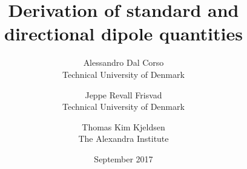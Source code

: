 \documentclass[10pt,a4paper]{article}
\title{Derivation of standard and directional dipole quantities}
\date{September 2017}
\author{Alessandro Dal Corso \\ Technical University of Denmark \and Jeppe Revall Frisvad \\ Technical University of Denmark
\and Thomas Kim Kjeldsen \\ The Alexandra Institute
}
\begin{document}
\maketitle
\newcommand{\vecfunc}[2] {\mathbf{#1}(\mathbf{#2})}
\newcommand{\func}[2] {{#1}(\mathbf{#2})}
\newcommand{\omegafunc}[2] {{#1}(\mathbf{#2}, \vec{\omega})}


\newcommand{\xvecfunc}[1] {\vecfunc{#1}{x}}
\newcommand{\xfunc}[1] {\func{#1}{x}}
\newcommand{\xomegafunc}[1] {\omegafunc{#1}{x}}
\newcommand{\nablavec} {{\nabla}}
\newcommand{\omegavec} {\vec{\omega}}
\newcommand{\sphere}[2] {\int_{4\pi}{#1}\ d{\ifthenelse{\isempty{#2}{}}{{\omega}}{#2}}}
\newcommand{\hemisphere}[2] {\int_{2\pi_+}{#1}\ d{\ifthenelse{\isempty{#2}{}}{{\omega}}{#2}}}
\newcommand{\lowerhemisphere}[2] {\int_{2\pi_-}{#1}\ d{\ifthenelse{\isempty{#2}{}}{{\omega}}{#2}}}

\newcommand{\absorption}{\sigma_a}
\newcommand{\transmission}{\sigma_{tr}}
\newcommand{\scattering}{\sigma_s}
\newcommand{\extinction}{\sigma_t}
\newcommand{\fluence}{G_0}
\newcommand{\flux}{\mathbf{G}_1}
\newcommand{\sourcezero}[1]{\func{Q_0}{#1}}
\newcommand{\sourcezerox}{\xfunc{Q_0}}
\newcommand{\sourceone}[1]{\mathbf{Q}_1(\mathbf{#1})}
\newcommand{\sourceonex}{\mathbf{Q}_1(\mathbf{x})}
\newcommand{\redsca}{{\sigma}'_s}
\newcommand{\redext}{{\sigma}'_t}
\newcommand{\redscaEddington}{\tilde{\sigma}_s}
\newcommand{\redextEddington}{\tilde{\sigma}_t}
\newcommand{\de}{\text{d}}
\newcommand{\cphi}{C_{\phi}}
\newcommand{\cE}{C_{\mathbf{E}}}
\end{document}
